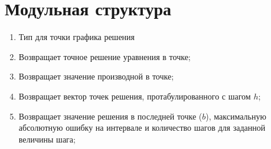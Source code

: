 \section{Модульная структура}



\begin{enumerate}
    \item Тип для точки графика решения

    \item Возвращает точное решение уравнения в точке;

    \item Возвращает значение производной в точке;

    \item Возвращает вектор точек решения, протабулированного с шагом $h$;

    \item Возвращает значение решения в последней точке ($b$), максимальную абсолютную ошибку на интервале и количество шагов для заданной величины шага;

\end{enumerate}


